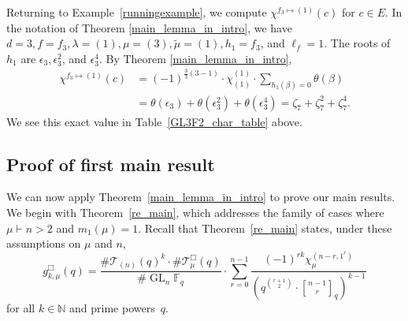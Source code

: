 \documentclass[Unicode,ALCO]{cedram}
\DeclareMathOperator{\GL}{GL}
\newcommand{\F}{\mathbb{F}}
\newcommand{\N}{\mathbb{N}}
\newcommand{\CT}{\mathcal{T}}
\newcommand{\eps}{\epsilon}
\newcommand{\te}{\theta}
\begin{document}
\begin{example}
Returning to Example~\ref{runningexample}, we compute $\chi^{f_3 \mapsto (1)} (c)$ for $c \in E$.
In the notation of Theorem \ref{main_lemma_in_intro}, we have $d = 3, f = f_3, \lambda = (1), \mu = (3), \tilde{\mu} = (1), h_1 = f_3$, and $\ell_f = 1$.
The roots of $h_1$ are $\eps_3, \eps_3^2$, and $\eps_3^4$.
By Theorem \ref{main_lemma_in_intro},
\begin{align*}
\chi^{f_3 \mapsto (1)} (c)
& =
(-1)^{\frac{3}{3}(3-1)}
\cdot
\chi^{(1)}_{(1)}
\cdot
\sum_{h_1(\beta) = 0} \te(\beta) \\
& = \te(\eps_3) + \te(\eps_3^2) + \te(\eps_3^4)
= \zeta_7 + \zeta_7^2 + \zeta_7^4.
\end{align*}
We see this exact value in Table~\ref{GL3F2_char_table} above.
\end{example}






































































\subsection{Proof of first main result}

We can now apply Theorem~\ref{main_lemma_in_intro} to prove our main results.
We begin with Theorem~\ref{re_main}, which addresses the family of cases where \(\mu \vdash n > 2\) and \(m_1(\mu) = 1\).
Recall that Theorem~\ref{re_main} states, under these assumptions on \(\mu\) and \(n\),
\begin{equation}
g_{k,\mu}^\Box(q)
=
\frac{\# \CT_{(n)} (q)^k
\cdot
\# \CT_\mu^\Box (q)}{\# \GL_n \F_q}
\cdot
\sum_{r=0}^{n-1}
\frac{(-1)^{rk} \chi^{(n-r,1^r)}_\mu}{\left ( q^{\binom{r+1}{2}} \cdot {\genfrac[]{0pt}{1}{n - 1}{r}}_{q} \right )^{k-1}}
\end{equation}
for all \(k \in \N\) and prime powers~\(q\).
\end{document}
